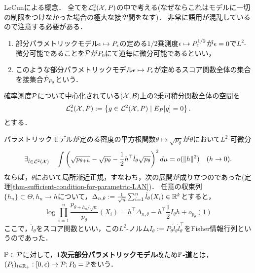 \documentclass[uplatex,dvipdfmx]{jsreport}
\begin{document}
\begin{tcolorbox}[colframe=ForestGreen, colback=ForestGreen!10!white,breakable,colbacktitle=ForestGreen!40!white,coltitle=black,fonttitle=\bfseries\sffamily,
title=]
    LeCunによる概念．
    全てを$\L^2_*(\X,P)$の中で考える(なぜならこれはモデルに一切の制限をつけなかった場合の極大な接空間をなす)．
    非常に語用が混乱しているので注意する必要がある．
    \begin{enumerate}
        \item 部分パラメトリックモデル$\ep\mapsto P_\ep$の定める$1/2$乗測度$\ep\mapsto P^{1/2}_\ep$が$\ep=0$で$L^2$-微分可能であることを$\P$が$P_0$にて道毎に微分可能であるといい，
        \item このような部分パラメトリックモデル$\ep\mapsto P_\ep$が定めるスコア関数全体の集合を接集合$\dot{\P}_{P_0}$という．
    \end{enumerate}
\end{tcolorbox}

\begin{notation}
    確率測度$\P$について中心化されている$(\X,\B)$上の2乗可積分関数全体の空間を
    \[\L^2_*(\X,P):=\Brace{g\in\L^2(\X,P)\mid E_P[g]=0}.\]
    とする．
\end{notation}

\begin{discussion}[パラメトリックな場合]
    パラメトリックモデルが定める密度の平方根関数$\theta\mapsto\sqrt{p_\theta}$が$\theta$において$L^2$-可微分
    \[\exists_{\dot{l}\in\L^2(\X)}\quad\int\paren{\sqrt{p_{\theta+h}}-\sqrt{p_\theta}-\frac{1}{2}h^\top \dot{l}_\theta\sqrt{p_\theta}}^2d\mu=o(\norm{h}^2)\quad(h\to0).\]
    ならば，$\theta$において局所漸近正規，すなわち，次の展開が成り立つのであった(定理\ref{thm-sufficient-condition-for-parametric-LAN})．
    任意の収束列$\{h_n\}\subset\Theta,h_n\to h$について，$\Delta_{n,\theta}:=\frac{1}{\sqrt{n}}\sum^n_{i=1}\dot{l}_\theta(X_i)\in\R^k$とすると，
    \[\log\prod_{i=1}^n\frac{p_{\theta+h_n/\sqrt{n}}}{p_\theta}(X_i)=h^\top\Delta_{n,\theta}-h^\top\frac{1}{2}I_\theta h+o_{p_\theta}(1)\]
    ここで，$\dot{l}_\theta$をスコア関数といい，この$L^2$-ノルム$I_\theta:=P_\theta\dot{l}_\theta\dot{l}_\theta^\top$をFisher情報行列というのであった．
\end{discussion}

\begin{definition}[$P$-path]
    $\bP\in\P$に対して，\textbf{1次元部分パラメトリックモデル}改ため\textbf{$\bP$-道}とは，$(P_t)_{t\in\R_+}:[0,\ep)\to\P;P_0=\bP$をいう．
\end{definition}
\end{document}
